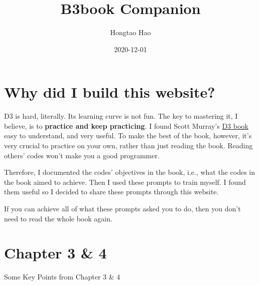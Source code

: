 \documentclass[
]{book}
\title{B3book Companion}
\author{Hongtao Hao}
\date{2020-12-01}
\begin{document}
\maketitle

{
\setcounter{tocdepth}{1}
\tableofcontents
}
\hypertarget{why-did-i-build-this-website}{%
\chapter*{Why did I build this website?}\label{why-did-i-build-this-website}}

D3 is hard, literally. Its learning curve is not fun. The key to mastering it, I believe, is to \textbf{practice and keep practicing}. I found Scott Murray's \href{https://alignedleft.com/work/d3-book-2e}{D3 book} easy to understand, and very useful. To make the best of the book, however, it's very crucial to practice on your own, rather than just reading the book. Reading others' codes won't make you a good programmer.

Therefore, I documented the codes' objectives in the book, i.e., what the codes in the book aimed to achieve. Then I used these prompts to train myself. I found them useful so I decided to share these prompts through this website.

If you can achieve all of what these prompts asked you to do, then you don't need to read the whole book again.

\mainmatter

\hypertarget{chapter3_and_4}{%
\chapter{Chapter 3 \& 4}\label{chapter3_and_4}}

Some Key Points from Chapter 3 \& 4
\end{document}
